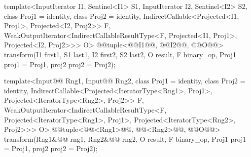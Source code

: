 \begin{addedblock}
\begin{itemdecl}
template<InputIterator I1, Sentinel<I1> S1, InputIterator I2, Sentinel<I2> S2,
    class Proj1 = identity, class Proj2 = identity,
    IndirectCallable<Projected<I1, Proj1>, Projected<I2, Proj2>> F,
    WeakOutputIterator<IndirectCallableResultType<F, Projected<I1, Proj1>,
      Projected<I2, Proj2>>> O>
  @@tuple<@@I1@\newtxt{)}@, @@I2@\newtxt{)}@, @@O@\newtxt{)}@>
    transform(I1 first1, S1 last1, I2 first2, S2 last2, O result,
              F binary_op, Proj1 proj1 = Proj1{}, proj2 proj2 = Proj2{});

template<Input@@ Rng1, Input@@ Rng2,
    class Proj1 = identity, class Proj2 = identity,
    IndirectCallable<Projected<IteratorType<Rng1>, Proj1>,
      Projected<IteratorType<Rng2>, Proj2>> F,
    WeakOutputIterator<IndirectCallableResultType<F,
      Projected<IteratorType<Rng1>, Proj1>, Projected<IteratorType<Rng2>, Proj2>>> O>
  @@tuple<@@<Rng1>@\newtxt{)}@,
               @@<Rng2>@\newtxt{)}@,
               @@O@\newtxt{)}@>
    transform(Rng1&@\newtxt{\&}@ rng1, Rng2&@\newtxt{\&}@ rng2, O result,
              F binary_op, Proj1 proj1 = Proj1{}, proj2 proj2 = Proj2{});
\end{itemdecl}
\end{addedblock}

